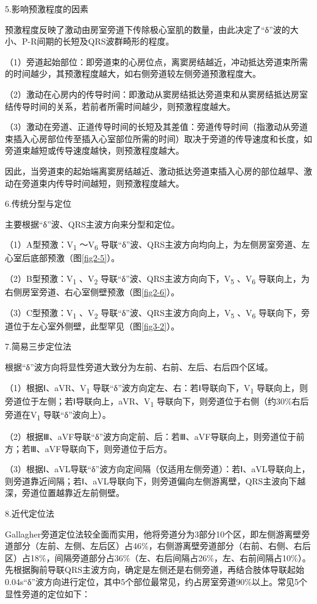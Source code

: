 5.影响预激程度的因素

预激程度反映了激动由房室旁道下传除极心室肌的数量，由此决定了“δ”波的大小、P-R间期的长短及QRS波群畸形的程度。

（1）旁道起始部位：即旁道束的心房位点，离窦房结越近，冲动抵达旁道束所需的时间越少，其预激程度越大，如右侧旁道较左侧旁道预激程度大。

（2）激动在心房内的传导时间：即激动从窦房结抵达旁道束和从窦房结抵达房室结传导时间的关系，若前者所需时间越少，则预激程度越大。

（3）激动在旁道、正道传导时间的长短及其差值：旁道传导时间（指激动从旁道束插入心房部位传至插入心室部位所需的时间）取决于旁道的传导速度和长度，如旁道束越短或传导速度越快，则预激程度越大。

因此，当旁道束的起始端离窦房结越近、激动抵达旁道束插入心房的部位越早、激动在旁道束内传导时间越短，则预激程度越大。

6.传统分型与定位

主要根据“δ”波、QRS主波方向来分型和定位。

（1）A型预激：V\textsubscript{1} ～V\textsubscript{6}
导联“δ”波、QRS主波方向均向上，为左侧房室旁道、左心室后底部预激（图\ref{fig2-5}）。

（2）B型预激：V\textsubscript{1} 、V\textsubscript{2}
导联“δ”波、QRS主波方向向下，V\textsubscript{5} 、V\textsubscript{6}
导联向上，为右侧房室旁道、右心室侧壁预激（图\ref{fig2-6}）。

（3）C型预激：V\textsubscript{1} 、V\textsubscript{2}
导联“δ”波、QRS主波方向向上，V\textsubscript{5} 、V\textsubscript{6}
导联向下，旁道位于左心室外侧壁，此型罕见（图\ref{fig3-2}）。

7.简易三步定位法

根据“δ”波方向将显性旁道大致分为左前、右前、左后、右后四个区域。

（1）根据Ⅰ、aVR、V\textsubscript{1}
导联“δ”波方向定左、右：若Ⅰ导联向下，V\textsubscript{1}
导联向上，则旁道位于左侧；若Ⅰ导联向上，aVR、V\textsubscript{1}
导联向下，则旁道位于右侧（约30\%右后旁道在V\textsubscript{1}
导联“δ”波向上）。

（2）根据Ⅲ、aVF导联“δ”波方向定前、后：若Ⅲ、aVF导联向上，则旁道位于前方；若Ⅲ、aVF导联向下，则旁道位于后方。

（3）根据Ⅰ、aVL导联“δ”波方向定间隔（仅适用左侧旁道）：若Ⅰ、aVL导联向上，则旁道靠近间隔；若Ⅰ、aVL导联向下，则旁道偏向左侧游离壁，QRS主波向下越深，旁道位置越靠近左前侧壁。

8.近代定位法

Gallagher旁道定位法较全面而实用，他将旁道分为3部分10个区，即左侧游离壁旁道部分（左前、左侧、左后区）占46\%，右侧游离壁旁道部分（右前、右侧、右后区）占18\%，间隔旁道部分占36\%（左、右后间隔占26\%，左、右前间隔占10\%）。先根据胸前导联QRS主波方向，确定是左侧还是右侧旁道，再结合肢体导联起始0.04s“δ”波方向进行定位，其中5个部位最常见，约占房室旁道90\%以上。常见5个显性旁道的定位如下：

